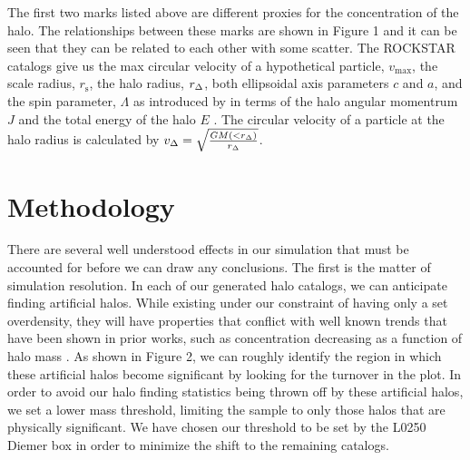 \documentclass[usenatbib,usegraphicx,letterpaper]{mn2e}
\begin{document}
The first two marks listed above are different proxies for the concentration of the halo. The relationships between these marks are shown in Figure 1 and it can be seen that they can be related to each other with some scatter. The ROCKSTAR catalogs give us the max  circular velocity of a hypothetical particle, $v_{\mathrm{max}}$, the scale radius, $r_{\mathrm{s}}$, the halo radius, $r_{\Delta}$, both ellipsoidal axis parameters $c$ and $a$, and the spin parameter, $\Lambda$ as introduced by \citep{peebles69} in terms of the halo angular momentrum $J$ and the total energy of the halo $E$ . The circular velocity of a particle at the halo radius is calculated by $v_{\Delta} = \sqrt{\frac{G M(< r_{\Delta})}{r_{\Delta}}}$.

\section[]{Methodology}
\label{section:methodology}

There are several well understood effects in our simulation that must be accounted for before we can draw any conclusions. The first is the matter of simulation resolution. In each of our generated halo catalogs, we can anticipate finding artificial halos. While existing under our constraint of having only a set overdensity, they will have properties that conflict with well known trends that have been shown in prior works, such as concentration decreasing as a function of halo mass \citep{wechsler06}. As shown in Figure 2, we can roughly identify the region in which these artificial halos become significant by looking for the turnover in the plot. In order to avoid our halo finding statistics being thrown off by these artificial halos, we set a lower mass threshold, limiting the sample to only those halos that are physically significant. We have chosen our threshold to be set by the L0250 Diemer box in order to minimize the shift to the remaining catalogs.
\end{document}
